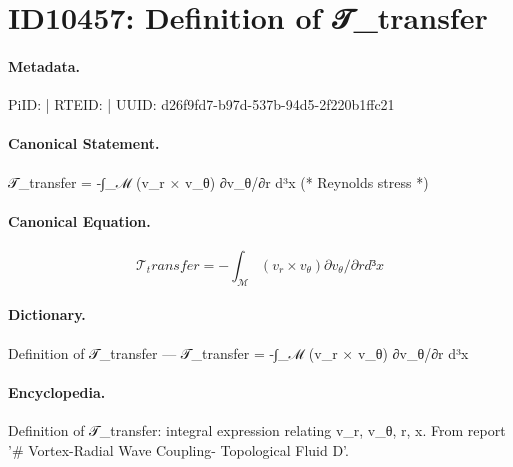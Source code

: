 \section*{ID10457: Definition of 𝒯\_transfer}
\paragraph{Metadata.}
PiID:  | RTEID:  | UUID: d26f9fd7-b97d-537b-94d5-2f220b1ffc21

\paragraph{Canonical Statement.}
𝒯\_transfer = -∫\_ℳ (v\_r × v\_θ) ∂v\_θ/∂r d³x (* Reynolds stress *)

\paragraph{Canonical Equation.}
\[
𝒯_transfer = -∫_ℳ (v_r × v_θ) ∂v_θ/∂r d³x
\]

\paragraph{Dictionary.}
Definition of 𝒯\_transfer — 𝒯\_transfer = -∫\_ℳ (v\_r × v\_θ) ∂v\_θ/∂r d³x

\paragraph{Encyclopedia.}
Definition of 𝒯\_transfer: integral expression relating v\_r, v\_θ, r, x. From report '\# Vortex-Radial Wave Coupling- Topological Fluid D'.
